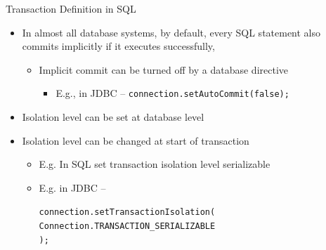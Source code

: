 \documentclass{beamer}
\begin{document}
\begin{frame}{Transaction Definition in SQL}
    \begin{itemize}
        \item In almost all database systems, by default, every SQL statement also commits implicitly if it executes successfully,
            \begin{itemize}
                \item Implicit commit can be turned off by a database directive
                    \begin{itemize}
                        \item E.g., in JDBC -- \texttt{connection.setAutoCommit(false);}
                    \end{itemize}

            \end{itemize}
        \item Isolation level can be set at database level
        \item Isolation level can be changed at start of transaction
            \begin{itemize}
                \item E.g. In SQL set transaction isolation level serializable
                \item E.g. in JDBC -- \\
                    \begin{scriptsize}
                \texttt{connection.setTransactionIsolation(} \\
                \quad \texttt{Connection.TRANSACTION\_SERIALIZABLE} \\
                \texttt{);}
                    \end{scriptsize}

            \end{itemize}
    \end{itemize}
\end{frame}
\end{document}

